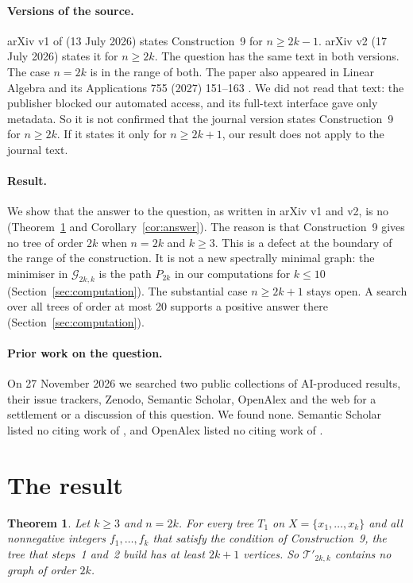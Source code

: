 \documentclass[11pt]{article}
\newtheorem{theorem}{Theorem}
\theoremstyle{definition}
\newcommand{\G}{\mathcal{G}}
\newcommand{\Tp}{\mathcal{T}'}
\begin{document}
\paragraph{Versions of the source.}
arXiv v1 of \cite{HT} (13 July 2026) states Construction~9 for $n \ge 2k-1$. arXiv v2
(17 July 2026) states it for $n \ge 2k$. The question has the same text in both versions.
The case $n = 2k$ is in the range of both. The paper also appeared in Linear Algebra and
its Applications 755 (2027) 151--163 \cite{HTj}. We did not read that text: the publisher
blocked our automated access, and its full-text interface gave only metadata. So it is
not confirmed that the journal version states Construction~9 for $n \ge 2k$. If it states
it only for $n \ge 2k+1$, our result does not apply to the journal text.

\paragraph{Result.}
We show that the answer to the question, as written in arXiv v1 and v2, is no
(Theorem~\ref{thm:main} and Corollary~\ref{cor:answer}). The reason is that Construction~9
gives no tree of order $2k$ when $n = 2k$ and $k \ge 3$. This is a defect at the boundary
of the range of the construction. It is not a new spectrally minimal graph: the minimiser
in $\G_{2k,k}$ is the path $P_{2k}$ in our computations for $k \le 10$ (Section~\ref{sec:computation}).
The substantial case $n \ge 2k+1$ stays open. A search over all trees of order at most 20
supports a positive answer there (Section~\ref{sec:computation}).

\paragraph{Prior work on the question.}
On 27 November 2026 we searched two public collections of AI-produced results, their
issue trackers, Zenodo, Semantic Scholar, OpenAlex and the web for a settlement or a
discussion of this question. We found none. Semantic Scholar listed no citing work of
\cite{HT}, and OpenAlex listed no citing work of \cite{HTj}.

\section{The result}

\begin{theorem}\label{thm:main}
Let $k \ge 3$ and $n = 2k$. For every tree $T_1$ on $X = \{x_1,\dots,x_k\}$ and all
nonnegative integers $f_1,\dots,f_k$ that satisfy the condition of Construction~9, the
tree that steps~1 and~2 build has at least $2k+1$ vertices. So $\Tp_{2k,k}$ contains no
graph of order $2k$.
\end{theorem}
\end{document}
